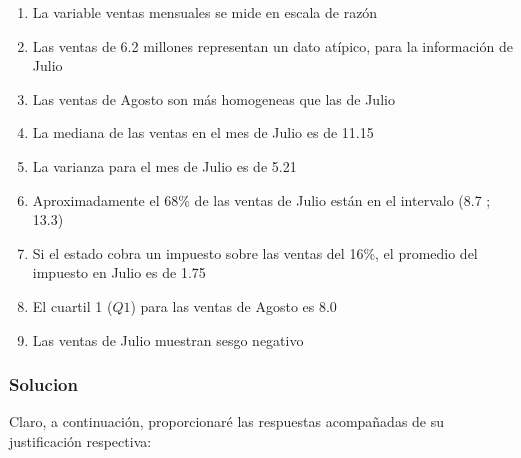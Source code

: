 \documentclass[
]{article}
\providecommand{\tightlist}{%
  \setlength{\itemsep}{0pt}\setlength{\parskip}{0pt}}
\begin{document}
\begin{enumerate}
\def\labelenumi{\alph{enumi}.}
\tightlist
\item
  La variable ventas mensuales se mide en escala de razón
\item
  Las ventas de 6.2 millones representan un dato atípico, para la
  información de Julio
\item
  Las ventas de Agosto son más homogeneas que las de Julio
\item
  La mediana de las ventas en el mes de Julio es de 11.15
\item
  La varianza para el mes de Julio es de 5.21
\item
  Aproximadamente el 68\% de las ventas de Julio están en el intervalo
  (8.7 ; 13.3)
\item
  Si el estado cobra un impuesto sobre las ventas del 16\%, el promedio
  del impuesto en Julio es de 1.75
\item
  El cuartil 1 (\(Q1\)) para las ventas de Agosto es 8.0
\item
  Las ventas de Julio muestran sesgo negativo
\end{enumerate}

\hypertarget{solucion-4}{%
\subsubsection{\texorpdfstring{\textbf{Solucion}}{Solucion}}\label{solucion-4}}

Claro, a continuación, proporcionaré las respuestas acompañadas de su
justificación respectiva:
\end{document}
